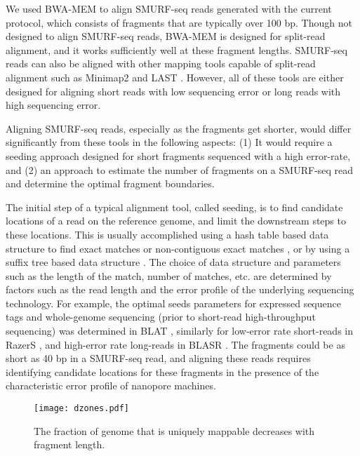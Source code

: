 We used BWA-MEM \citep{li2013aligning} to align SMURF-seq reads
generated with the current protocol, which consists of fragments that
are typically over 100 bp. Though not designed to align SMURF-seq reads,
BWA-MEM is designed for split-read alignment, and it works sufficiently
well at these fragment lengths.  SMURF-seq reads can also be aligned
with other mapping tools capable of split-read alignment such as
Minimap2 \citep{li2018minimap2} and LAST \citep{kielbasa2011adaptive}.
However, all of these tools are either designed for aligning short reads
with low sequencing error or long reads with high sequencing error.

Aligning SMURF-seq reads, especially as the fragments get shorter, would
differ significantly from these tools in the following aspects: (1) It
would require a seeding approach designed for short fragments sequenced
with a high error-rate, and  (2) an approach to estimate the number of
fragments on a SMURF-seq read and determine the optimal fragment
boundaries.

The initial step of a typical alignment tool, called seeding, is to find
candidate locations of a read on the reference genome, and limit the
downstream steps to these locations.
%
This is usually accomplished using a hash table based data structure to
find exact matches
\citep{altschul1990basic,altschul1997gapped,kent2002blat} or
non-contiguous exact matches \citep{ma2002patternhunter,chen2009perm},
or by using a suffix tree based data structure
\citep{kurtz2004versatile,langmead2009ultrafast,li2009fast,
li2010fast,li2013aligning}.
%
The choice of data structure and parameters such as the length of the
match, number of matches, etc. are determined by factors such as the
read length and the error profile of the underlying sequencing
technology.
%
For example, the optimal seeds parameters for expressed sequence tags
and whole-genome sequencing (prior to short-read high-throughput
sequencing) was determined in BLAT \citep{kent2002blat}, similarly for
low-error rate short-reads in RazerS \citep{weese2009razers}, and
high-error rate long-reads in BLASR \citep{chaisson2012mapping}.
%
The fragments could be as short as 40 bp in a SMURF-seq read, and
aligning these reads requires identifying candidate locations for these
fragments in the presence of the characteristic error profile of
nanopore machines.

\begin{figure}[t!]
\centering
\texttt{[image: dzones.pdf]}
\caption[Uniquely mappable fraction of the genome decreases fragment
  length]{
  The fraction of genome that is uniquely mappable decreases with
  fragment length.}
\label{dzones}
\end{figure}

